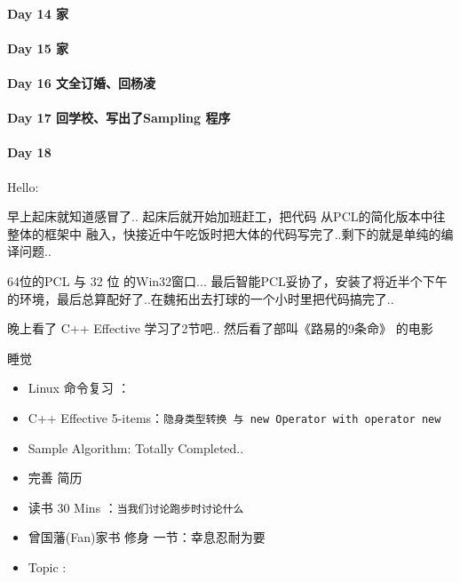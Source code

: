 \documentclass[UTF8,a4paper,8pt]{ctexart}
\begin{document}
 	 \paragraph{Day 14 家     \quad     }
 	 \paragraph{Day 15 家     \quad     }
 	 \paragraph{Day 16 文全订婚、回杨凌     \quad     }
 	 \paragraph{Day 17 回学校、写出了Sampling 程序   \quad     }
	 	 
 	 \paragraph{Day 18      \quad     }Hello:
 	 
	 	 早上起床就知道感冒了.. 起床后就开始加班赶工，把代码 从PCL的简化版本中往整体的框架中 融入，快接近中午吃饭时把大体的代码写完了..剩下的就是单纯的编译问题..
	 	 
	 	 64位的PCL 与 32 位 的Win32窗口... 最后智能PCL妥协了，安装了将近半个下午的环境，最后总算配好了..在魏拓出去打球的一个小时里把代码搞完了..
	 	 
	 	 晚上看了 C++ Effective 学习了2节吧.. 然后看了部叫《路易的9条命》 的电影
	 	 
	 	 睡觉
	 	 \begin{itemize}[itemindent = 1em]
	 	 	\renewcommand\labelitemi{\makebox[0pt][l]{$\square$}\hspace{1em}} 
	 	 	\renewcommand\labelitemi{\makebox[0pt][l]{$\square$}\raisebox{.15ex}{\hspace{0.1em}$\checkmark$}}	 	
	 	 	\item   Linux 命令复习 ：
	 	 	\item   C++ Effective 5-items：\verb|隐身类型转换 与 new Operator with operator new|
	 	 	\item   Sample Algorithm: Totally Completed..
	 	 	\item   完善 简历
	 	 	
	 	 	\item   读书  30 Mins	：\verb|当我们讨论跑步时讨论什么|	
	 	 	\renewcommand\labelitemi{\makebox[0pt][l]{$\square$}\hspace{1em}} 
	 	 	
	 	 	\renewcommand\labelitemi{\makebox[0pt][l]{$\square$}\raisebox{.15ex}{\hspace{0.1em}$\checkmark$}}
	 	 	\item  曾国藩(Fan)家书 修身 一节：幸息忍耐为要
	 	 	\item   Topic : 
	 	 \end{itemize}
\end{document}
